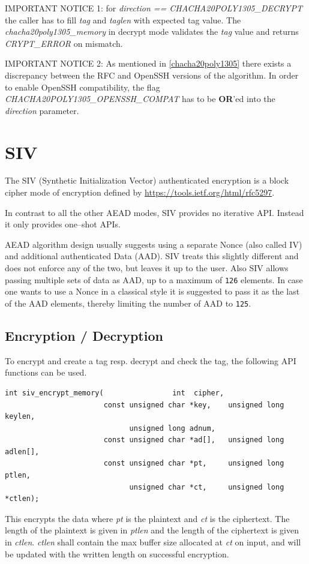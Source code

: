\documentclass[synpaper]{book}
\newcommand{\mysection}[1]    %
	{                   %
	\section{#1}
   \markboth{\textsf{www.libtom.net}}{\thesection ~ {#1}}
	}
\begin{document}
IMPORTANT NOTICE 1: for \textit{direction == CHACHA20POLY1305\_DECRYPT} the caller has to fill \textit{tag} and \textit{taglen} with expected
tag value. The \textit{chacha20poly1305\_memory} in decrypt mode validates the \textit{tag} value and returns \textit{CRYPT\_ERROR} on mismatch.

IMPORTANT NOTICE 2: As mentioned in \ref{chacha20poly1305} there exists a discrepancy between the RFC and OpenSSH versions of the algorithm.
In order to enable OpenSSH compatibility, the flag \textit{CHACHA20POLY1305\_OPENSSH\_COMPAT} has to be \textbf{OR}'ed into
the \textit{direction} parameter.


\mysection{SIV}
\label{SIV}

The SIV (Synthetic Initialization Vector) authenticated encryption is a block cipher mode of encryption
defined by \url{https://tools.ietf.org/html/rfc5297}.

In contrast to all the other AEAD modes, SIV provides no iterative API. Instead it only provides one--shot APIs.

AEAD algorithm design usually suggests using a separate Nonce (also called IV) and additional authenticated Data (AAD).
SIV treats this slightly different and does not enforce any of the two, but leaves it up to the user.
Also SIV allows passing multiple sets of data as AAD, up to a maximum of \texttt{126} elements.
In case one wants to use a Nonce in a classical style it is suggested to pass it as the last of the AAD elements,
thereby limiting the number of AAD to \texttt{125}.

\subsection{Encryption / Decryption}
To encrypt and create a tag resp. decrypt and check the tag, the following API functions can be used.

\begin{verbatim}
int siv_encrypt_memory(                int  cipher,
                       const unsigned char *key,    unsigned long  keylen,
                             unsigned long adnum,
                       const unsigned char *ad[],   unsigned long  adlen[],
                       const unsigned char *pt,     unsigned long  ptlen,
                             unsigned char *ct,     unsigned long *ctlen);
\end{verbatim}
This encrypts the data where \textit{pt} is the plaintext and \textit{ct} is the ciphertext.
The length of the plaintext is given in \textit{ptlen} and the length of the ciphertext is given in \textit{ctlen}.
\textit{ctlen} shall contain the max buffer size allocated at \textit{ct} on input, and will be updated with the
written length on successful encryption.
\end{document}
